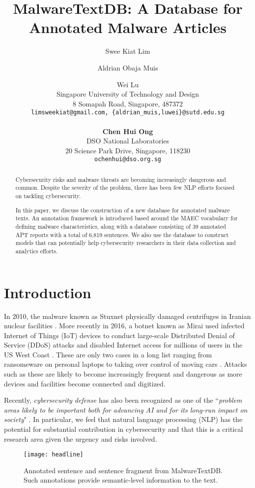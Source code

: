 \documentclass[11pt,a4paper]{article}
\title{MalwareTextDB: A Database for Annotated Malware Articles}
\author{Swee Kiat Lim \and Aldrian Obaja Muis \and Wei Lu \\
  Singapore University of Technology and Design \\
  8 Somapah Road, Singapore, 487372 \\
  {\tt limsweekiat@gmail.com, \{aldrian\_muis,luwei\}@sutd.edu.sg}\\\\
  \textbf{Chen Hui Ong} \\
  DSO National Laboratories\\
  20 Science Park Drive, Singapore, 118230 \\
  {\tt ochenhui@dso.org.sg}}
\date{}
\begin{document}
\maketitle
\begin{abstract}

Cybersecurity risks and malware threats are becoming increasingly dangerous and common. Despite the severity of the problem, there has been few NLP efforts focused on tackling cybersecurity.

In this paper, we discuss the construction of a new database for annotated malware texts. An annotation framework is introduced based around the MAEC vocabulary for defining malware characteristics, along with a database consisting of 39 annotated APT reports with a total of 6,819 sentences. We also use the database to construct models that can potentially help cybersecurity researchers in their data collection and analytics efforts.

\end{abstract}

\section{Introduction}

In 2010, the malware known as Stuxnet physically damaged centrifuges in Iranian nuclear facilities \cite{Langner:11}. More recently in 2016, a botnet known as Mirai used infected Internet of Things (IoT) devices to conduct large-scale Distributed Denial of Service (DDoS) attacks and disabled Internet access for millions of users in the US West Coast \cite{USCERT:16}. These are only two cases in a long list ranging from ransomeware on personal laptops \cite{Andronio:15} to taking over control of moving cars \cite{Checkoway:11}. Attacks such as these are likely to become increasingly frequent and dangerous as more devices and facilities become connected and digitized.

Recently, {\em cybersecurity defense} has also been recognized as one of the ``{\em problem areas likely to be important both for advancing AI and for its long-run impact on society}" \cite{openai}.
In particular, we feel that natural language processing (NLP) has the potential for substantial contribution in cybersecurity and that this is a critical research area given the urgency and risks involved. 

\begin{figure}[t]
\centering
\texttt{[image: headline]}

\vspace{-2mm}

\caption{\label{headline}Annotated sentence and sentence fragment from MalwareTextDB. 
Such annotations provide semantic-level information to the text. 
\vspace{-1em}
}

\end{figure}
\end{document}
